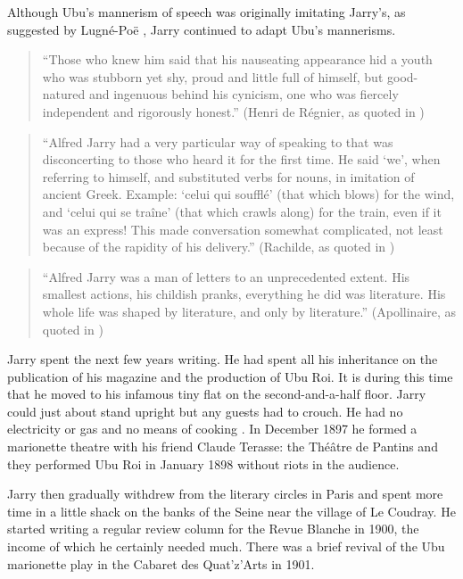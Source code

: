 Although Ubu's mannerism of speech was originally imitating Jarry's, as suggested by Lugné-Poë \citep[p.155]{Brotchie2011}, Jarry continued to adapt Ubu's mannerisms.

\begin{quote}
  ``Those who knew him said that his nauseating appearance hid a youth who was stubborn yet shy, proud and little full of himself, but good-natured and ingenuous behind his cynicism, one who was fiercely independent and rigorously honest.'' (Henri de Régnier, as quoted in \citep[p.181]{Brotchie2011})
\end{quote}

\begin{quote}
  ``Alfred Jarry had a very particular way of speaking to that was disconcerting to those who heard it for the first time. He said `we', when referring to himself, and substituted verbs for nouns, in imitation of ancient Greek. Example: `celui qui soufflé' (that which blows) for the wind, and `celui qui se traîne' (that which crawls along) for the train, even if it was an express! This made conversation somewhat complicated, not least because of the rapidity of his delivery.'' (Rachilde, as quoted in \citep[p.181]{Brotchie2011})
\end{quote}

\begin{quote}
  ``Alfred Jarry was a man of letters to an unprecedented extent. His smallest actions, his childish pranks, everything he did was literature. His whole life was shaped by literature, and only by literature.'' (Apollinaire, as quoted in \citep[p.307]{Brotchie2011})
\end{quote}

Jarry spent the next few years writing. He had spent all his inheritance on the publication of his magazine and the production of Ubu Roi. It is during this time that he moved to his infamous tiny flat on the second-and-a-half floor. Jarry could just about stand upright but any guests had to crouch. He had no electricity or gas and no means of cooking \citep[p.195]{Brotchie2011}. In December 1897 he formed a marionette theatre with his friend Claude Terasse: the Théâtre de Pantins and they performed Ubu Roi in January 1898 without riots in the audience.

Jarry then gradually withdrew from the literary circles in Paris and spent more time in a little shack on the banks of the Seine near the village of Le Coudray. He started writing a regular review column for the Revue Blanche in 1900, the income of which he certainly needed much. There was a brief revival of the Ubu marionette play in the Cabaret des Quat'z'Arts in 1901.

